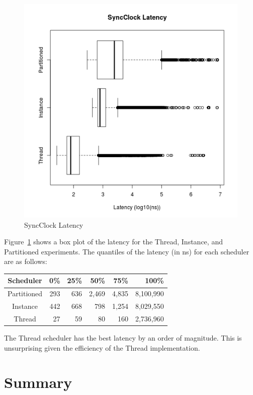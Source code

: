 \begin{figure}[H]
\center
\includegraphics[height=.4\textheight]{sync_latency_box.png}
\caption{SyncClock Latency}
\label{sync_latency_box}
\end{figure}

Figure~\ref{sync_latency_box} shows a box plot of the latency for the Thread, Instance, and Partitioned experiments.
The quantiles of the latency (in ns) for each scheduler are as follows:
\begin{center}
\begin{tabular}{crrrrr}
Scheduler &       0\%  &    25\%  &    50\%  &    75\%  &   100\% \\
\hline
Partitioned & 293 &   636 & 2,469 & 4,835 &  8,100,990 \\
Instance    & 442 &   668 &   798 & 1,254 &  8,029,550 \\
Thread      &  27 &    59 &    80 &   160 &  2,736,960 \\
\end{tabular}
\end{center}
The Thread scheduler has the best latency by an order of magnitude.
This is unsurprising given the efficiency of the Thread implementation.

\section{Summary}

